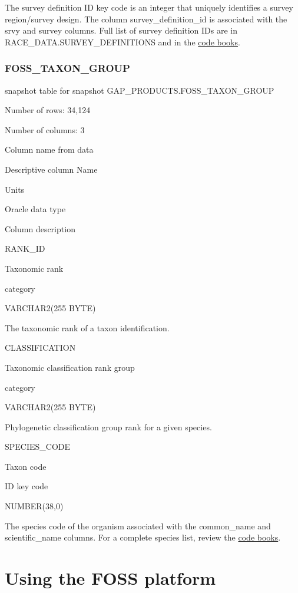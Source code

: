 \documentclass[
  letterpaper,
  oneside,
  open=any]{scrbook}
\begin{document}
The survey definition ID key code is an integer that uniquely identifies
a survey region/survey design. The column survey\_definition\_id is
associated with the srvy and survey columns. Full list of survey
definition IDs are in RACE\_DATA.SURVEY\_DEFINITIONS and in the
\href{https://www.fisheries.noaa.gov/resource/document/groundfish-survey-species-code-manual-and-data-codes-manual}{code
books}.

\subsection{FOSS\_TAXON\_GROUP}\label{foss_taxon_group}

snapshot table for snapshot GAP\_PRODUCTS.FOSS\_TAXON\_GROUP

Number of rows: 34,124

Number of columns: 3

Column name from data

Descriptive column Name

Units

Oracle data type

Column description

RANK\_ID

Taxonomic rank

category

VARCHAR2(255 BYTE)

The taxonomic rank of a taxon identification.

CLASSIFICATION

Taxonomic classification rank group

category

VARCHAR2(255 BYTE)

Phylogenetic classification group rank for a given species.

SPECIES\_CODE

Taxon code

ID key code

NUMBER(38,0)

The species code of the organism associated with the common\_name and
scientific\_name columns. For a complete species list, review the
\href{https://www.fisheries.noaa.gov/resource/document/groundfish-survey-species-code-manual-and-data-codes-manual}{code
books}.

\chapter{Using the FOSS platform}\label{using-the-foss-platform}
\end{document}

